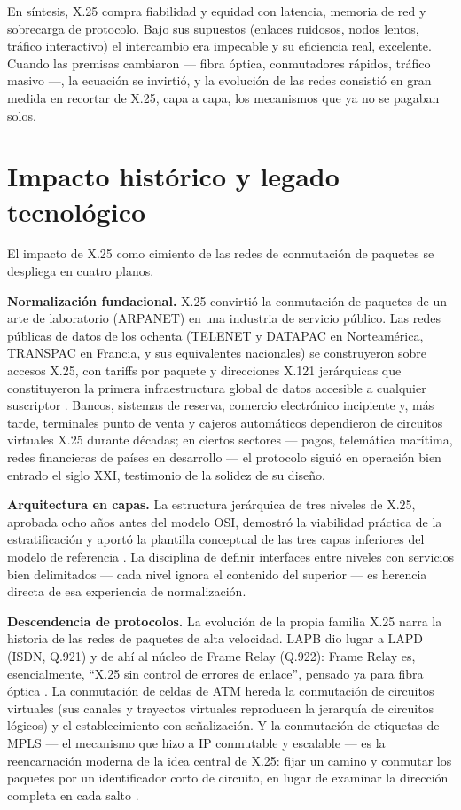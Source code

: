 \documentclass[12pt,a4paper]{article}
\begin{document}
En síntesis, X.25 compra fiabilidad y equidad con latencia, memoria de red y sobrecarga de protocolo. Bajo sus supuestos (enlaces ruidosos, nodos lentos, tráfico interactivo) el intercambio era impecable y su eficiencia real, excelente. Cuando las premisas cambiaron --- fibra óptica, conmutadores rápidos, tráfico masivo ---, la ecuación se invirtió, y la evolución de las redes consistió en gran medida en recortar de X.25, capa a capa, los mecanismos que ya no se pagaban solos.

\section{Impacto histórico y legado tecnológico}

El impacto de X.25 como cimiento de las redes de conmutación de paquetes se despliega en cuatro planos.

\textbf{Normalización fundacional.} X.25 convirtió la conmutación de paquetes de un arte de laboratorio (ARPANET) en una industria de servicio público. Las redes públicas de datos de los ochenta (TELENET y DATAPAC en Norteamérica, TRANSPAC en Francia, y sus equivalentes nacionales) se construyeron sobre accesos X.25, con tariffs por paquete y direcciones X.121 jerárquicas que constituyeron la primera infraestructura global de datos accesible a cualquier suscriptor \cite{rybczynski1980, schwartz1987}. Bancos, sistemas de reserva, comercio electrónico incipiente y, más tarde, terminales punto de venta y cajeros automáticos dependieron de circuitos virtuales X.25 durante décadas; en ciertos sectores --- pagos, telemática marítima, redes financieras de países en desarrollo --- el protocolo siguió en operación bien entrado el siglo XXI, testimonio de la solidez de su diseño.

\textbf{Arquitectura en capas.} La estructura jerárquica de tres niveles de X.25, aprobada ocho años antes del modelo OSI, demostró la viabilidad práctica de la estratificación y aportó la plantilla conceptual de las tres capas inferiores del modelo de referencia \cite{tanenbaum2012}. La disciplina de definir interfaces entre niveles con servicios bien delimitados --- cada nivel ignora el contenido del superior --- es herencia directa de esa experiencia de normalización.

\textbf{Descendencia de protocolos.} La evolución de la propia familia X.25 narra la historia de las redes de paquetes de alta velocidad. LAPB dio lugar a LAPD (ISDN, Q.921) y de ahí al núcleo de Frame Relay (Q.922): Frame Relay es, esencialmente, ``X.25 sin control de errores de enlace'', pensado ya para fibra óptica \cite{stallings2004}. La conmutación de celdas de ATM hereda la conmutación de circuitos virtuales (sus canales y trayectos virtuales reproducen la jerarquía de circuitos lógicos) y el establecimiento con señalización. Y la conmutación de etiquetas de MPLS --- el mecanismo que hizo a IP conmutable y escalable --- es la reencarnación moderna de la idea central de X.25: fijar un camino y conmutar los paquetes por un identificador corto de circuito, en lugar de examinar la dirección completa en cada salto \cite{tanenbaum2012, kurose2017}.
\end{document}
